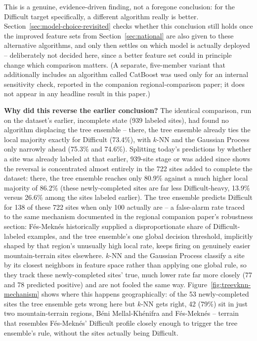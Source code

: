 \documentclass[11pt,a4paper]{article}
\begin{document}
This is a genuine, evidence-driven finding, not a foregone conclusion: for the Difficult target specifically, a different algorithm really is better. Section~\ref{sec:model-choice-revisited} checks whether this conclusion still holds once the improved feature sets from Section~\ref{sec:national} are also given to these alternative algorithms, and only then settles on which model is actually deployed -- deliberately not decided here, since a better feature set could in principle change which comparison matters. (A separate, five-member variant that additionally includes an algorithm called CatBoost was used only for an internal sensitivity check, reported in the companion regional-comparison paper; it does not appear in any headline result in this paper.)

\textbf{Why did this reverse the earlier conclusion?} The identical comparison, run on the dataset's earlier, incomplete state (939 labeled sites), had found no algorithm displacing the tree ensemble -- there, the tree ensemble already ties the local majority exactly for Difficult (73.4\%), with $k$-NN and the Gaussian Process only narrowly ahead (75.3\% and 74.6\%). Splitting today's predictions by whether a site was already labeled at that earlier, 939-site stage or was added since shows the reversal is concentrated almost entirely in the 722 sites added to complete the dataset: there, the tree ensemble reaches only 80.9\% against a much higher local majority of 86.2\% (these newly-completed sites are far less Difficult-heavy, 13.9\% versus 26.6\% among the sites labeled earlier). The tree ensemble predicts Difficult for 138 of these 722 sites when only 100 actually are -- a false-alarm rate traced to the same mechanism documented in the regional companion paper's robustness section: Fés-Meknés historically supplied a disproportionate share of Difficult-labeled examples, and the tree ensemble's one global decision threshold, implicitly shaped by that region's unusually high local rate, keeps firing on genuinely easier mountain-terrain sites elsewhere. $k$-NN and the Gaussian Process classify a site by its closest neighbors in feature space rather than applying one global rule, so they track these newly-completed sites' true, much lower rate far more closely (77 and 78 predicted positive) and are not fooled the same way. Figure~\ref{fig:treevknn-mechanism} shows where this happens geographically: of the 53 newly-completed sites the tree ensemble gets wrong here but $k$-NN gets right, 42 (79\%) sit in just two mountain-terrain regions, Béni Mellal-Khénifra and Fés-Meknés -- terrain that resembles Fés-Meknés' Difficult profile closely enough to trigger the tree ensemble's rule, without the sites actually being Difficult.
\end{document}
